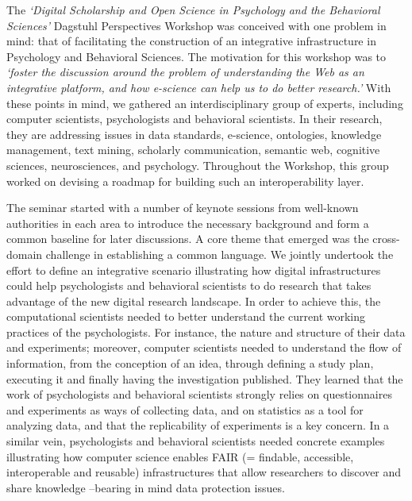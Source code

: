 \documentclass[a4paper,UKenglish]{dagrep}
\begin{document}
The \emph{`Digital Scholarship and Open Science in Psychology and the Behavioral
Sciences'} Dagstuhl Perspectives Workshop was conceived with one problem in
mind: that of facilitating the construction of an integrative infrastructure in
Psychology and Behavioral Sciences. The motivation for this workshop was to
\emph{`foster the discussion around the problem of understanding the Web as an
integrative platform, and how e-science can help us to do better research.'}
With these points in mind, we gathered an interdisciplinary group of experts,
including computer scientists, psychologists and behavioral scientists. In their
research, they are addressing issues in data standards, e-science, ontologies,
knowledge management, text mining, scholarly communication, semantic web,
cognitive sciences, neurosciences, and psychology. Throughout the Workshop, this
group worked on devising a roadmap for building such an interoperability layer. 

The seminar started with a number of keynote sessions from well-known
authorities in each area to introduce the necessary background and form a common
baseline for later discussions. A core theme that emerged was the cross-domain
challenge in establishing a common language.  We jointly undertook the effort to
define an integrative scenario illustrating how digital infrastructures could
help psychologists and behavioral scientists to do research that takes advantage
of the new digital research landscape. In order to achieve this, the
computational scientists needed to better understand the current working
practices of the psychologists. For instance, the nature and structure of their
data and experiments; moreover, computer scientists needed to understand the
flow of information, from the conception of an idea, through defining a study
plan, executing it and finally having the investigation published. They learned
that the work of psychologists and behavioral scientists strongly relies on
questionnaires and experiments as ways of collecting data, and on statistics as
a tool for analyzing data, and that the replicability of experiments is a key
concern. In a similar vein, psychologists and behavioral scientists needed
concrete examples illustrating how computer science enables FAIR (= findable,
accessible, interoperable and reusable) infrastructures that allow researchers
to discover and share knowledge --bearing in mind data protection issues. 
\end{document}
